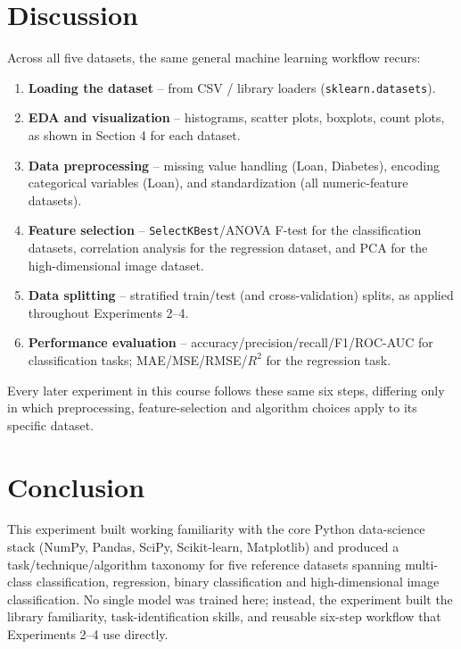 \documentclass[12pt,a4paper]{article}
\begin{document}
\section{Discussion}
Across all five datasets, the same general machine learning workflow recurs:
\begin{enumerate}[nosep]
\item \textbf{Loading the dataset} -- from CSV / library loaders (\texttt{sklearn.datasets}).
\item \textbf{EDA and visualization} -- histograms, scatter plots, boxplots, count
plots, as shown in Section 4 for each dataset.
\item \textbf{Data preprocessing} -- missing value handling (Loan, Diabetes), encoding
categorical variables (Loan), and standardization (all numeric-feature datasets).
\item \textbf{Feature selection} -- \texttt{SelectKBest}/ANOVA F-test for the
classification datasets, correlation analysis for the regression dataset, and PCA for
the high-dimensional image dataset.
\item \textbf{Data splitting} -- stratified train/test (and cross-validation) splits, as
applied throughout Experiments 2--4.
\item \textbf{Performance evaluation} -- accuracy/precision/recall/F1/ROC-AUC for
classification tasks; MAE/MSE/RMSE/$R^2$ for the regression task.
\end{enumerate}
Every later experiment in this course follows these same six steps, differing only in
which preprocessing, feature-selection and algorithm choices apply to its specific
dataset.

\section{Conclusion}
This experiment built working familiarity with the core Python data-science stack
(NumPy, Pandas, SciPy, Scikit-learn, Matplotlib) and produced a task/technique/algorithm
taxonomy for five reference datasets spanning multi-class classification, regression,
binary classification and high-dimensional image classification. No single model was
trained here; instead, the experiment built the library familiarity, task-identification
skills, and reusable six-step workflow that Experiments 2--4 use directly.
\end{document}
